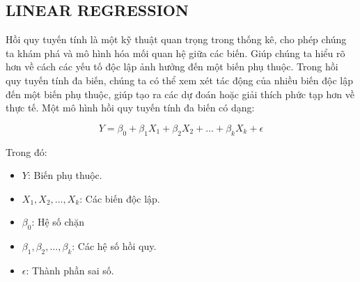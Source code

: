 \subsection{LINEAR REGRESSION}
Hồi quy tuyến tính là một kỹ thuật quan trọng trong thống kê, cho phép chúng ta khám phá và mô hình hóa mối quan hệ giữa các biến. Giúp chúng ta hiểu rõ hơn về cách các yếu tố độc lập ảnh hưởng đến một biến phụ thuộc. Trong hồi quy tuyến tính đa biến, chúng ta có thể xem xét tác động của nhiều biến độc lập đến một biến phụ thuộc, giúp tạo ra các dự đoán hoặc giải thích phức tạp hơn về thực tế. Một mô hình hồi quy tuyến tính đa biến có dạng:

\[ Y = \beta_0 + \beta_1 X_1 + \beta_2 X_2 + \ldots + \beta_k X_k + \epsilon \]

Trong đó:
\begin{itemize}
  \item \( Y \): Biến phụ thuộc.
  \item \( X_1, X_2, \ldots , X_k \): Các biến độc lập.
  \item \( \beta_0 \): Hệ số chặn
  \item \( \beta_1, \beta_2, \ldots, \beta_k \): Các hệ số hồi quy.
  \item \( \epsilon \): Thành phần sai số.
\end{itemize}
